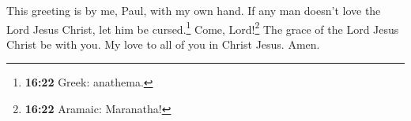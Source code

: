 \begin{paracol}{2}
\begin{otherlanguage}{english}
 This greeting is by me, Paul, with my own hand.
 If any man doesn't love the Lord Jesus Christ, let him
be cursed.\footnote{\textbf{16:22} Greek: anathema.} Come,
Lord!\footnote{\textbf{16:22} Aramaic: Maranatha!}  The
grace of the Lord Jesus Christ be with you.  My love to
all of you in Christ Jesus. Amen. \end{otherlanguage}
\end{paracol}
